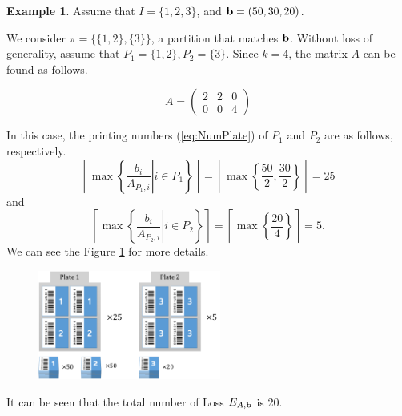 \documentclass[a4paper]{amsart}
\numberwithin{equation}{section} %
\numberwithin{figure}{section} %
\numberwithin{table}{section}
\theoremstyle{plain}
\theoremstyle{definition}
\newtheorem{example}[thm]{Example}
\theoremstyle{plain}
\theoremstyle{plain}
\theoremstyle{plain}
\theoremstyle{plain}
\theoremstyle{plain}
\begin{document}
\begin{example}
	Assume that $I=\{1,2,3\}$, and ${\bf b}=(50,30,20)$.
	
	We consider $\pi = \{\{1,2\}, \{3\}\}$, a partition that matches ${\bf b}$. 
	Without loss of generality, assume that $P_{1} = \{1,2\}, P_{2} = \{3\}$. Since $k = 4$, the matrix $A$ can be found as follows.
	
	\begin{equation}
		A = \left(\begin{array}{ccc}2 & 2 & 0 \\ 0 & 0 & 4 \end{array}\right)
	\end{equation}
	
	In this case, the printing numbers (\ref{eq:NumPlate}) of $P_1$ and $P_2$ are as follows, respectively.
	\begin{equation}
		\left\lceil \max\left\{ \left. \frac{b_{i}}{A_{P_{1},i}} \right| i \in P_{1} \right\} \right\rceil = \left\lceil \max \left\{ \frac{50}{2}, \frac{30}{2} \right\} \right\rceil = 25
	\end{equation}
	and
	\begin{equation}
	\left\lceil \max\left\{ \left. \frac{b_{i}}{A_{P_{2},i}} \right| i \in P_{2} \right\} \right\rceil = \left\lceil \max \left\{ \frac{20}{4} \right\} \right\rceil = 5.
	\end{equation}
	We can see the Figure \ref{fig:ex11} for more details.
	
	\begin{figure}[h!]
		\centering
		\includegraphics[width=6cm]{ex11.pdf}
		\caption{}
		\label{fig:ex11}       %
	\end{figure}
	
	It can be seen that the total number of Loss $E_{A,{\bf b}}$ is 20.
	

\end{example}
\end{document}
